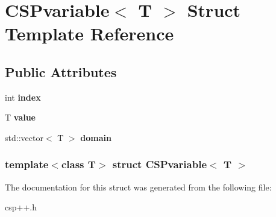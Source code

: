 \hypertarget{structCSPvariable}{
\section{CSPvariable$<$ T $>$ Struct Template Reference}
\label{structCSPvariable}
}
\subsection*{Public Attributes}
\begin{DoxyCompactItemize}
\item 
\hypertarget{structCSPvariable_a1fb7622b0576133aa9a2445da22fddac}{
int {\bfseries index}}
\label{structCSPvariable_a1fb7622b0576133aa9a2445da22fddac}

\item 
\hypertarget{structCSPvariable_acc2ff31b449351f04b1c3a2a096e584c}{
T {\bfseries value}}
\label{structCSPvariable_acc2ff31b449351f04b1c3a2a096e584c}

\item 
\hypertarget{structCSPvariable_a66cf86ebf0fbbf8e571d7b585c9528a2}{
std::vector$<$ T $>$ {\bfseries domain}}
\label{structCSPvariable_a66cf86ebf0fbbf8e571d7b585c9528a2}

\end{DoxyCompactItemize}
\subsubsection*{template$<$class T$>$ struct CSPvariable$<$ T $>$}



The documentation for this struct was generated from the following file:\begin{DoxyCompactItemize}
\item 
csp++.h\end{DoxyCompactItemize}
